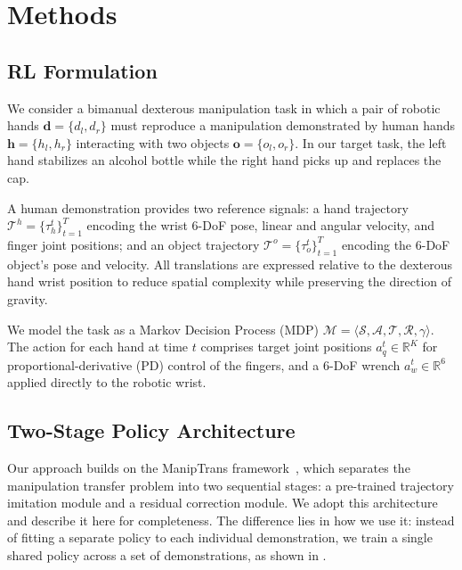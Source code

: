 \section{Methods}

\subsection{RL Formulation}
We consider a bimanual dexterous manipulation task in which a pair of robotic hands
$\mathbf{d} = \{d_l, d_r\}$ must reproduce a manipulation demonstrated by human hands
$\mathbf{h} = \{h_l, h_r\}$ interacting with two objects $\mathbf{o} = \{o_l, o_r\}$.
In our target task, the left hand stabilizes an alcohol bottle while the right hand picks
up and replaces the cap.
 
A human demonstration provides two reference signals: a hand trajectory
$\mathcal{T}^h = \{\tau^t_h\}_{t=1}^{T}$ encoding the wrist 6-DoF pose, linear and angular
velocity, and finger joint positions; and an object trajectory
$\mathcal{T}^o = \{\tau^t_o\}_{t=1}^{T}$ encoding the 6-DoF object's pose and velocity.
All translations are expressed relative to the dexterous hand wrist position to reduce
spatial complexity while preserving the direction of gravity.
 
We model the task as a Markov Decision Process (MDP)
$\mathcal{M} = \langle \mathcal{S}, \mathcal{A}, \mathcal{T}, \mathcal{R}, \gamma \rangle$.
The action for each hand at time $t$ comprises target joint positions
$a^t_q \in \mathbb{R}^K$ for proportional-derivative (PD) control of the fingers, and a
6-DoF wrench $a^t_w \in \mathbb{R}^6$ applied directly to the robotic wrist.
 
\subsection{Two-Stage Policy Architecture}
\label{sec:two-stage}
 
Our approach builds on the ManipTrans framework~\cite{maniptrans}, which separates the
manipulation transfer problem into two sequential stages: a pre-trained trajectory
imitation module and a residual correction module.
We adopt this architecture and describe it here for completeness. The difference lies in how we use it: instead of fitting a separate policy to each individual demonstration, we train a single shared policy across a set of demonstrations, as shown in .


